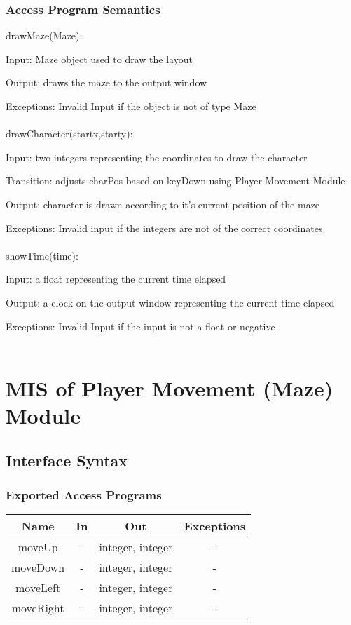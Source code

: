 \documentclass[12pt, titlepage]{article}
\begin{document}
		\subsubsection{Access Program Semantics}
		
		drawMaze(Maze):
		
		Input: Maze object used to draw the layout
		
		Output: draws the maze to the output window
		
		Exceptions: Invalid Input if the object is not of type Maze\\
		\\
		drawCharacter(startx,starty):
		
		Input: two integers representing the coordinates to draw the character
		
		Transition: adjusts charPos based on keyDown using Player Movement Module
		
		Output: character is drawn according to it's current position of the maze
		
		Exceptions: Invalid input if the integers are not of the correct coordinates\\
		\\
		showTime(time):
		
		Input: a float representing the current time elapsed
		
		Output: a clock on the output window representing the current time elapsed
		
		Exceptions: Invalid Input if the input is not a float or negative\\
		\\
		
\section{MIS of Player Movement (Maze) Module}
		\subsection{Interface Syntax}
		\subsubsection{Exported Access Programs}
		\begin{tabular}[pos]{|c|c|c|c|}
			\hline
			\textbf{Name}& \textbf{In} & \textbf{Out} & \textbf{Exceptions} \\ \hline
			moveUp & - & integer, integer & - \\ \hline
			moveDown & - & integer, integer & - \\ \hline
			moveLeft & - & integer, integer & - \\ \hline
			moveRight & - & integer, integer & - \\ \hline
		\end{tabular}
		
\end{document}
